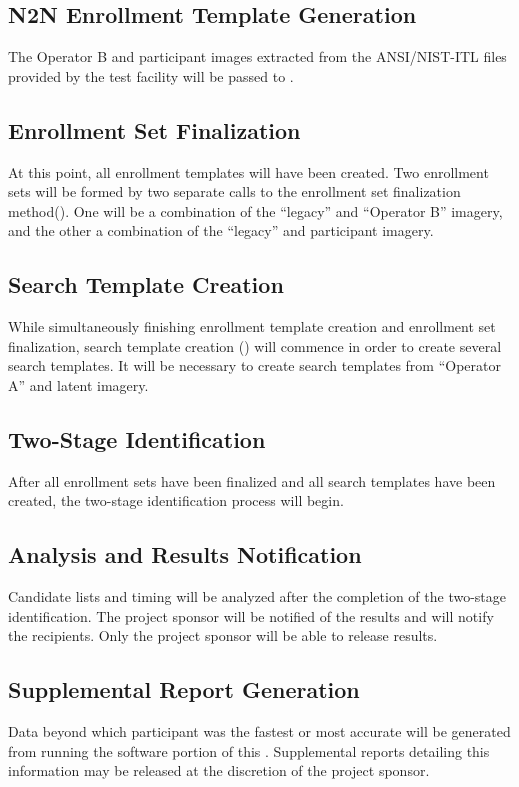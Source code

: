 \subsection{N2N Enrollment Template Generation}
The Operator B and participant \scanner images extracted from the ANSI/NIST-ITL
files provided by the test facility will be passed to
.

\subsection{Enrollment Set Finalization}
At this point, all enrollment templates will have been created. Two enrollment
sets will be formed by two separate calls to the enrollment set finalization
method(). One will be a combination of the
``legacy'' and ``Operator B'' imagery, and the other a combination of the
``legacy'' and participant \scanner imagery.

\subsection{Search Template Creation}
While simultaneously finishing enrollment template creation and enrollment set
finalization, search template creation () will
commence in order to create several search templates. It will be necessary to
create search templates from ``Operator A'' and latent imagery.

\subsection{Two-Stage Identification}
After all enrollment sets have been finalized and all search templates have been
created, the two-stage identification process will begin.

\subsection{Analysis and Results Notification}
Candidate lists and timing will be analyzed after the completion of the
two-stage identification. The project sponsor will be notified of the results
and will notify the recipients. Only the project sponsor will be able to release
results.

\subsection{Supplemental Report Generation}
Data beyond which participant was the fastest or most accurate will be
generated from running the software portion of this \project. Supplemental
reports detailing this information may be released at the discretion of the
project sponsor.
